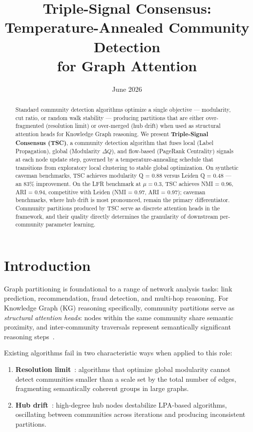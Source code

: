 \documentclass[10pt,twocolumn]{article}
\title{\textbf{Triple-Signal Consensus: Temperature-Annealed Community Detection\\for Graph Attention}}
\date{June 2026}
\begin{document}
\maketitle

\begin{abstract}
Standard community detection algorithms optimize a single objective — modularity,
cut ratio, or random walk stability — producing partitions that are either
over-fragmented (resolution limit) or over-merged (hub drift) when used as
structural attention heads for Knowledge Graph reasoning. We present
\textbf{Triple-Signal Consensus (TSC)}, a community detection algorithm that fuses
local (Label Propagation), global (Modularity $\Delta Q$), and flow-based
(PageRank Centrality) signals at each node update step, governed by a
temperature-annealing schedule that transitions from exploratory local clustering
to stable global optimization. On synthetic caveman benchmarks, TSC achieves
modularity Q = 0.88 versus Leiden Q = 0.48 — an 83\% improvement. On the LFR
benchmark at $\mu = 0.3$, TSC achieves NMI = 0.96, ARI = 0.94, competitive
with Leiden (NMI = 0.97, ARI = 0.97); caveman benchmarks, where hub drift is
most pronounced, remain the primary differentiator. Community partitions produced by TSC serve as discrete attention
heads in the \CEREBRUM{} framework, and their quality directly determines the
granularity of downstream per-community parameter learning.
\end{abstract}

\section{Introduction}
\label{sec:intro}

Graph partitioning is foundational to a range of network analysis tasks: link prediction,
recommendation, fraud detection, and multi-hop reasoning. For Knowledge Graph (KG)
reasoning specifically, community partitions serve as \emph{structural attention heads}:
nodes within the same community share semantic proximity, and inter-community traversals
represent semantically significant reasoning steps~\cite{buchorn2026flagship}.

Existing algorithms fail in two characteristic ways when applied to this role:
\begin{enumerate}
  \item \textbf{Resolution limit}~\cite{fortunato2007resolution}: algorithms that optimize
        global modularity cannot detect communities smaller than a scale set by the total
        number of edges, fragmenting semantically coherent groups in large graphs.
  \item \textbf{Hub drift}~\cite{blondel2008louvain}: high-degree hub nodes destabilize LPA-based
        algorithms, oscillating between communities across iterations and producing
        inconsistent partitions.
\end{enumerate}
\end{document}
